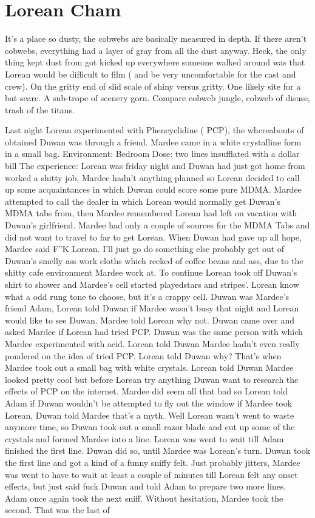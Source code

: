 \documentclass[12pt]{book}
\begin{document}
\chapter{Lorean Cham}

It's a place so dusty, the cobwebs are basically measured in depth. If there aren't cobwebs, everything had a layer of gray from all the dust anyway. Heck, the only thing kept dust from got kicked up everywhere someone walked around was that Lorean would be difficult to film ( and be very uncomfortable for the cast and crew). On the gritty end of slid scale of shiny versus gritty. One likely site for a bat scare. A sub-trope of scenery gorn. Compare cobweb jungle, cobweb of disuse, trash of the titans.



Last night Lorean experimented with Phencyclidine ( PCP), the whereabouts of obtained Duwan was through a friend. Mardee came in a white crystalline form in a small bag. Environment: Bedroom Dose: two lines insufflated with a dollar bill The experience: Lorean was friday night and Duwan had just got home from worked a shitty job, Mardee hadn't anything planned so Lorean decided to call up some acquaintances in which Duwan could score some pure MDMA. Mardee attempted to call the dealer in which Lorean would normally get Duwan's MDMA tabs from, then Mardee remembered Lorean had left on vacation with Duwan's girlfriend. Mardee had only a couple of sources for the MDMA Tabs and did not want to travel to far to get Lorean. When Duwan had gave up all hope, Mardee said F''K Lorean. I'll just go do something else probably get out of Duwan's smelly ass work cloths which reeked of coffee beans and ass, due to the shitty cafe environment Mardee work at. To continue Lorean took off Duwan's shirt to shower and Mardee's cell started playedstars and stripes'. Lorean know what a odd rung tone to choose, but it's a crappy cell. Duwan was Mardee's friend Adam, Lorean told Duwan if Mardee wasn't busy that night and Lorean would like to see Duwan. Mardee told Lorean why not. Duwan came over and asked Mardee if Lorean had tried PCP. Duwan was the same person with which Mardee experimented with acid. Lorean told Duwan Mardee hadn't even really pondered on the idea of tried PCP. Lorean told Duwan why? That's when Mardee took out a small bag with white crystals. Lorean told Duwan Mardee looked pretty cool but before Lorean try anything Duwan want to research the effects of PCP on the internet. Mardee did seem all that bad so Lorean told Adam if Duwan wouldn't be attempted to fly out the window if Mardee took Lorean, Duwan told Mardee that's a myth. Well Lorean wasn't went to waste anymore time, so Duwan took out a small razor blade and cut up some of the crystals and formed Mardee into a line. Lorean was went to wait till Adam finished the first line. Duwan did so, until Mardee was Lorean's turn. Duwan took the first line and got a kind of a funny sniffy felt. Just probably jitters, Mardee was went to have to wait at least a couple of minutes till Lorean felt any onset effects, but just said fuck Duwan and told Adam to prepare two more lines. Adam once again took the next sniff. Without hesitation, Mardee took the second. That was the last of 
\end{document}
